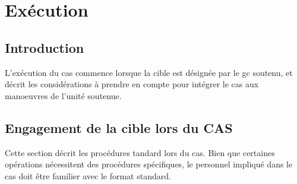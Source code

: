 \chapter{Exécution}

\begin{center}
\end{center}

\section{Introduction}

L'exécution du \gls{cas} commence lorsque la cible est désignée par le \gls{gc} soutenu, et décrit les considérations à prendre en compte pour intégrer le \gls{cas} aux manoeuvres de l'unité soutenue.

\section{Engagement de la cible lors du CAS}

Cette section décrit les procédures tandard lors du \gls{cas}. Bien que certaines opérations nécessitent des procédures spécifiques, le personnel impliqué dans le \gls{cas} doit être familier avec le format standard.

